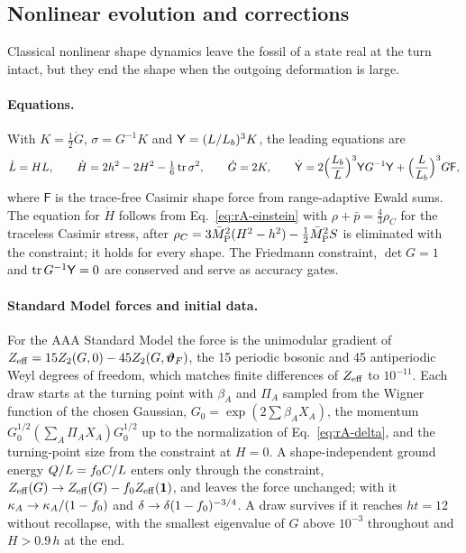 \subsection{Nonlinear evolution and corrections}
\label{rA:s-nonlinear}

Classical nonlinear shape dynamics leave the fossil of a state real at the turn intact, but they end the shape when the outgoing deformation is large.

\paragraph{Equations.}
With $K=\tfrac12\dot G$, $\sigma=G^{-1}K$ and $\mathsf Y=(L/L_b)^3K$, the leading equations are
\begin{equation}
\dot L=HL,\qquad \dot H=2h^2-2H^2-\tfrac16\operatorname{tr}\sigma^2,\qquad \dot G=2K,\qquad \dot{\mathsf Y}=2\Big(\frac{L_b}{L}\Big)^3\mathsf YG^{-1}\mathsf Y+\Big(\frac{L}{L_b}\Big)^3G\mathsf F,
\label{eq:rA-nl-eqs}
\end{equation}
where $\mathsf F$ is the trace-free Casimir shape force from range-adaptive Ewald sums.
The equation for $\dot H$ follows from Eq.~\eqref{eq:rA-einstein} with $\rho+\bar p=\tfrac43\rho_C$ for the traceless Casimir stress, after $\rho_C=3\bar M_{\mathrm{P}}^2(H^2-h^2)-\tfrac12\bar M_{\mathrm{P}}^2S$ is eliminated with the constraint; it holds for every shape.
The Friedmann constraint, $\det G=1$ and $\operatorname{tr} G^{-1}\mathsf Y=0$ are conserved and serve as accuracy gates.

\paragraph{Standard Model forces and initial data.}
For the AAA Standard Model the force is the unimodular gradient of $Z_{\rm eff}=15Z_2(G,0)-45Z_2(G,\bm\vartheta_F)$, the 15 periodic bosonic and 45 antiperiodic Weyl degrees of freedom, which matches finite differences of $Z_{\rm eff}$ to $10^{-11}$. %
Each draw starts at the turning point with $\beta_A$ and $\Pi_A$ sampled from the Wigner function of the chosen Gaussian, $G_0=\exp(2\sum\beta_AX_A)$, the momentum $G_0^{1/2}(\sum_A\Pi_AX_A)G_0^{1/2}$ up to the normalization of Eq.~\eqref{eq:rA-delta}, and the turning-point size from the constraint at $H=0$.
A shape-independent ground energy $Q/L=f_0 C/L$ enters only through the constraint, $Z_{\rm eff}(G)\to Z_{\rm eff}(G)-f_0 Z_{\rm eff}(\mathbf{1})$, and leaves the force unchanged; with it $\kappa_A\to\kappa_A/(1-f_0)$ and $\delta\to\delta(1-f_0)^{-3/4}$.
A draw survives if it reaches $ht=12$ without recollapse, with the smallest eigenvalue of $G$ above $10^{-3}$ throughout and $H>0.9\,h$ at the end. %

